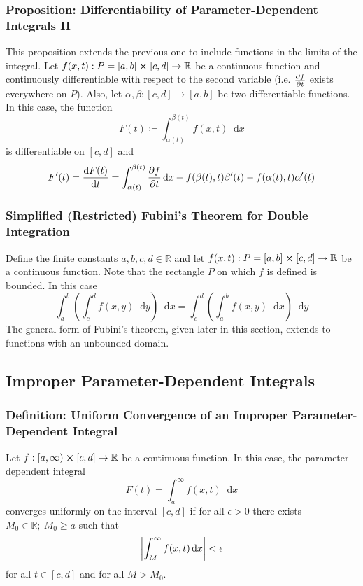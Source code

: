 \documentclass[11pt, a4paper]{article}
\newcommand{\diff}{\mathop{}\!\mathrm{d}} %
\newcommand{\R}{\mathbb{R}} %
\begin{document}
\subsubsection{Proposition: Differentiability of Parameter-Dependent Integrals II}
This proposition extends the previous one to include functions in the limits of the integral. Let $ f(x, t) : P = [a, b] \cross [c, d] \rightarrow \mathbb{R}$ be a continuous function and continuously differentiable with respect to the second variable (i.e. $ \pdv{f}{t} $ exists everywhere on $ P $). Also, let $ \alpha, \beta : [c, d] \rightarrow [a, b] $ be two differentiable functions. In this case, the function 
\begin{equation*}
F(t) \coloneqq \int_{\alpha(t)}^{\beta(t)}f(x, t) \diff x
\end{equation*}
is differentiable on $ [c, d] $ and
\begin{equation*}
F'(t) = \dv{F(t)}{t} = \int_{\alpha(t)}^{\beta(t)}\pdv{f}{t} (x, t) \diff x + f(\beta(t), t)\beta'(t) - f(\alpha(t), t)\alpha'(t)
\end{equation*}

\subsubsection{Simplified (Restricted) Fubini's Theorem for Double Integration}
Define the finite constants $ a, b, c, d \in \mathbb{R} $ and let $ f(x, t) : P = [a, b] \cross [c, d] \rightarrow \mathbb{R}$ be a continuous function. Note that the rectangle $ P $ on which $ f $ is defined is bounded. In this case
\begin{equation*}
\int_{a}^{b}\left(\int_{c}^{d} f(x, y) \diff y \right) \diff x = \int_{c}^{d}\left(\int_{a}^{b} f(x, y) \diff x \right) \diff y
\end{equation*}
The general form of Fubini's theorem, given later in this section, extends to functions with an unbounded domain.



\subsection{Improper Parameter-Dependent Integrals}

\subsubsection{Definition: Uniform Convergence of an Improper Parameter-Dependent Integral}
Let $ f: [a, \infty) \cross [c, d] \rightarrow \mathbb{R}$ be a continuous function. In this case, the parameter-dependent integral
\begin{equation*}
	F(t) = \int_{a}^{\infty}f(x,t) \diff x 
\end{equation*}
converges uniformly on the interval $ [c, d] $ if for all $ \epsilon > 0  $ there exists $ M_0 \in \R;\ M_0 \geq a $ such that
\begin{equation*}
	\abs{\int_{M}^{\infty}f(x,t) \diff x} < \epsilon
\end{equation*}
for all $ t \in [c, d] $ and for all $ M > M_0 $.
\end{document}
